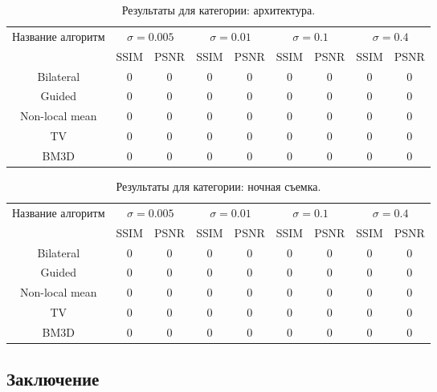 \begin{table}[H]
	\caption{\label{tab:bolts} Результаты для категории: архитектура.}
	\begin{tabular}{|c|c|c|c|c|c|c|c|c|}
		\hline
		Название алгоритм & \multicolumn{2}{|c|}{$\sigma=0.005$}  & \multicolumn{2}{|c|}{$\sigma=0.01$}& \multicolumn{2}{|c|}{$\sigma=0.1$} & \multicolumn{2}{|c|}{$\sigma=0.4$} \\
		\cline{2-9}
		& SSIM  & PSNR & SSIM  & PSNR & SSIM  & PSNR & SSIM  & PSNR\\
		\hline
		Bilateral & 0 & 0& 0 & 0& 0 & 0 & 0 & 0 \\
		\hline
		Guided & 0 & 0& 0 & 0& 0 & 0 & 0 & 0 \\
		\hline
		Non-local mean & 0 & 0& 0 & 0& 0 & 0 & 0 & 0 \\
		\hline
		TV & 0 & 0& 0 & 0& 0 & 0 & 0 & 0 \\
		\hline
		BM3D & 0 & 0& 0 & 0& 0 & 0 & 0 & 0 \\
		\hline	
	\end{tabular}
\end{table}

\begin{table}[H]
	\caption{\label{tab:bolts} Результаты для категории: ночная съемка.}
	\begin{tabular}{|c|c|c|c|c|c|c|c|c|}
		\hline
		Название алгоритм & \multicolumn{2}{|c|}{$\sigma=0.005$}  & \multicolumn{2}{|c|}{$\sigma=0.01$}& \multicolumn{2}{|c|}{$\sigma=0.1$} & \multicolumn{2}{|c|}{$\sigma=0.4$} \\
		\cline{2-9}
		& SSIM  & PSNR & SSIM  & PSNR & SSIM  & PSNR & SSIM  & PSNR\\
		\hline
		Bilateral & 0 & 0& 0 & 0& 0 & 0 & 0 & 0 \\
		\hline
		Guided & 0 & 0& 0 & 0& 0 & 0 & 0 & 0 \\
		\hline
		Non-local mean & 0 & 0& 0 & 0& 0 & 0 & 0 & 0 \\
		\hline
		TV & 0 & 0& 0 & 0& 0 & 0 & 0 & 0 \\
		\hline
		BM3D & 0 & 0& 0 & 0& 0 & 0 & 0 & 0 \\
		\hline	
	\end{tabular}
\end{table}


\subsection{Заключение}
